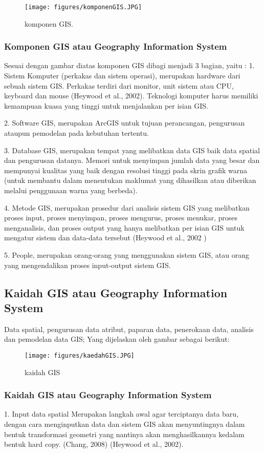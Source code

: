 \begin{figure}[ht]
	\centerline{\texttt{[image: figures/komponenGIS.JPG]}}
	\caption{komponen GIS.}
	\label{komponen GIS}
	\end{figure}

\subsubsection{Komponen GIS atau Geography Information System}
Sesuai dengan gambar diatas komponen GIS dibagi menjadi 3 bagian, yaitu :
1. Sistem Komputer (perkakas dan sistem operasi), merupakan hardware dari sebuah sistem GIS. Perkakas terdiri dari monitor, unit sistem atau CPU, keyboard dan mouse (Heywood et al., 2002). Teknologi komputer harus memiliki kemampuan kuasa
yang tinggi untuk menjalankan per isian GIS.

2. Software GIS, merupakan ArcGIS untuk tujuan perancangan, pengurusan ataupun pemodelan pada kebutuhan tertentu.

3. Database GIS, merupakan tempat yang melibatkan data GIS baik data spatial dan pengurusan datanya. Memori untuk menyimpan jumlah data yang besar dan mempunyai kualitas yang baik dengan resolusi tinggi pada skrin grafik warna (untuk membantu dalam menentukan maklumat yang dihasilkan atau diberikan melalui penggunaan warna yang berbeda).

4. Metode GIS, merupakan prosedur dari analisis sistem GIS yang melibatkan proses input, proses menyimpan, proses mengurus, proses menukar, proses menganalisis, dan proses output yang hanya melibatkan per isian GIS untuk mengatur sistem dan data-data tersebut (Heywood et al., 2002 )

5. People, merupakan orang-orang yang menggunakan sistem GIS, atau orang yang mengendalikan proses input-output sistem GIS. 

\subsection{Kaidah GIS atau Geography Information System}
Data spatial, pengurusan data atribut, paparan data, penerokaan data, analisis dan pemodelan data GIS;
Yang dijelaskan oleh gambar sebagai berikut:
\begin{figure}[ht]
	\centerline{\texttt{[image: figures/kaedahGIS.JPG]}}
	\caption{kaidah GIS}
	\label{kaidah GIS}
	\end{figure}

\subsubsection{Kaidah GIS atau Geography Information System}
1. Input data spatial
Merupakan langkah awal agar terciptanya data baru, dengan cara menginputkan data dan sistem GIS akan menyuntingnya dalam bentuk transformasi geometri yang nantinya akan menghasilkannya kedalam bentuk hard copy. (Chang, 2008) 
(Heywood et al., 2002).

